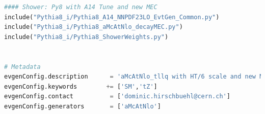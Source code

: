 \documentclass[NOTE, REPORT=true, atlasdraft=true, USenglish]{atlasdoc}
\begin{document}
\begin{lstlisting}[language=python, caption=$tqZ$ job option python script]
#### Shower: Py8 with A14 Tune and new MEC
include("Pythia8_i/Pythia8_A14_NNPDF23LO_EvtGen_Common.py")
include("Pythia8_i/Pythia8_aMcAtNlo_decayMEC.py")
include("Pythia8_i/Pythia8_ShowerWeights.py")


# Metadata
evgenConfig.description      = 'aMcAtNlo_tllq with HT/6 scale and new MEC'
evgenConfig.keywords        += ['SM','tZ']
evgenConfig.contact          = ['dominic.hirschbuehl@cern.ch']
evgenConfig.generators       = ['aMcAtNlo']
\end{lstlisting}

\printbibliography
% 
% 


% 
\end{document}
